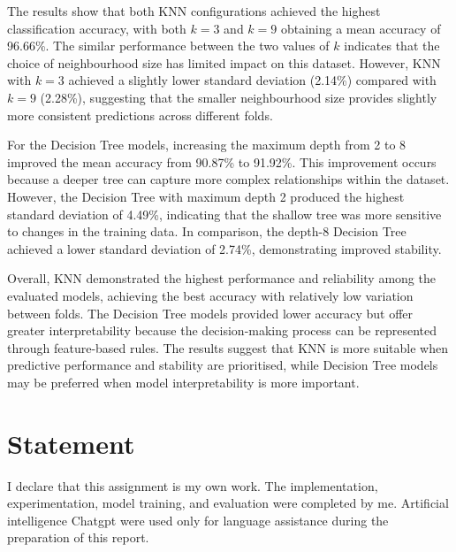 \documentclass[a4paper,12pt]{article}
\begin{document}
The results show that both KNN configurations achieved the highest classification accuracy, with both $k=3$ and $k=9$ obtaining a mean accuracy of 96.66\%. The similar performance between the two values of $k$ indicates that the choice of neighbourhood size has limited impact on this dataset. However, KNN with $k=3$ achieved a slightly lower standard deviation (2.14\%) compared with $k=9$ (2.28\%), suggesting that the smaller neighbourhood size provides slightly more consistent predictions across different folds.

For the Decision Tree models, increasing the maximum depth from 2 to 8 improved the mean accuracy from 90.87\% to 91.92\%. This improvement occurs because a deeper tree can capture more complex relationships within the dataset. However, the Decision Tree with maximum depth 2 produced the highest standard deviation of 4.49\%, indicating that the shallow tree was more sensitive to changes in the training data. In comparison, the depth-8 Decision Tree achieved a lower standard deviation of 2.74\%, demonstrating improved stability.

Overall, KNN demonstrated the highest performance and reliability among the evaluated models, achieving the best accuracy with relatively low variation between folds. The Decision Tree models provided lower accuracy but offer greater interpretability because the decision-making process can be represented through feature-based rules. The results suggest that KNN is more suitable when predictive performance and stability are prioritised, while Decision Tree models may be preferred when model interpretability is more important.

\section{Statement}

I declare that this assignment is my own work. The implementation, experimentation, model training, and evaluation were completed by me. Artificial intelligence Chatgpt\cite{chatgpt2026} were used only for language assistance during the preparation of this report.


\end{document}
